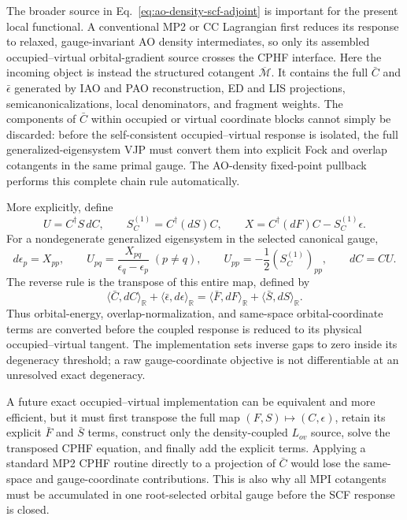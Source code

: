 \documentclass[11pt]{article}
\begin{document}
The broader source in Eq.~\eqref{eq:ao-density-scf-adjoint} is important for
the present local functional.  A conventional MP2 or CC Lagrangian first
reduces its response to relaxed, gauge-invariant AO density intermediates, so
only its assembled occupied--virtual orbital-gradient source crosses the CPHF
interface.  Here the incoming object is instead the structured cotangent
$\overline{\mathcal M}$.  It contains the full $\bar C$ and
$\bar\epsilon$ generated by IAO and PAO reconstruction, ED and LIS
projections, semicanonicalizations, local denominators, and fragment weights.
The components of $\bar C$ within occupied or virtual coordinate blocks
cannot simply be discarded: before the self-consistent occupied--virtual
response is isolated, the full generalized-eigensystem VJP must convert them
into explicit Fock and overlap cotangents in the same primal gauge.  The
AO-density fixed-point pullback performs this complete chain rule
automatically.

More explicitly, define
\begin{equation}
 U=C^\dagger S\,dC,\qquad
 S_C^{(1)}=C^\dagger(dS)C,\qquad
 X=C^\dagger(dF)C-S_C^{(1)}\epsilon.
 \label{eq:generalized-eigen-response-definitions}
\end{equation}
For a nondegenerate generalized eigensystem in the selected canonical gauge,
\begin{equation}
 d\epsilon_p=X_{pp},\qquad
 U_{pq}=\frac{X_{pq}}{\epsilon_q-\epsilon_p}\;(p\ne q),\qquad
 U_{pp}=-\frac12(S_C^{(1)})_{pp},\qquad dC=CU.
 \label{eq:generalized-eigen-response}
\end{equation}
The reverse rule is the transpose of this entire map, defined by
\begin{equation}
 \langle\bar C,dC\rangle_{\mathbb R}
 +\langle\bar\epsilon,d\epsilon\rangle_{\mathbb R}
 =\langle\bar F,dF\rangle_{\mathbb R}
 +\langle\bar S,dS\rangle_{\mathbb R}.
 \label{eq:generalized-eigen-transpose}
\end{equation}
Thus orbital-energy, overlap-normalization, and same-space orbital-coordinate
terms are converted before the coupled response is reduced to its physical
occupied--virtual tangent.  The implementation sets inverse gaps to zero
inside its degeneracy threshold; a raw gauge-coordinate objective is not
differentiable at an unresolved exact degeneracy.

A future exact occupied--virtual implementation can be equivalent and more
efficient, but it must first transpose the full map
$(F,S)\mapsto(C,\epsilon)$, retain its explicit $\bar F$ and $\bar S$
terms, construct only the density-coupled $L_{ov}$ source, solve the
transposed CPHF equation, and finally add the explicit terms.  Applying a
standard MP2 CPHF routine directly to a projection of $\bar C$ would lose
the same-space and gauge-coordinate contributions.  This is also why all MPI
cotangents must be accumulated in one root-selected orbital gauge before the
SCF response is closed.
\end{document}
